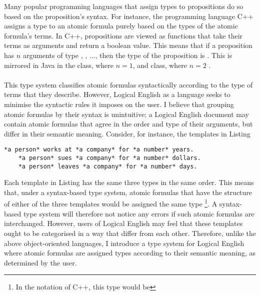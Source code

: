 \documentclass[../main.tex]{subfiles}
\begin{document}
Many popular programming languages that assign types to propositions do so based on the proposition's syntax. For instance, the programming language C++ assigns a type to an atomic formula purely based on the types of the atomic formula's terms. In C++, propositions are viewed as functions that take their terms as arguments and return a boolean value. This means that if a proposition has $n$ arguments of type , , $\dots$,  then the type of the proposition is  \cite{std_predicate}. This is mirrored in Java in the  class, where $n = 1$, and  class, where $n = 2$ \cite{java_util_function}. 
\\
\\
This type system classifies atomic formulas syntactically according to the type of terms that they describe. However, Logical English as a language seeks to minimise the syntactic rules it imposes on the user. I believe that grouping atomic formulas by their syntax is unintuitive; a Logical English document may contain atomic formulas that agree in the order and type of their arguments, but differ in their semantic meaning. Consider, for instance, the templates in Listing \cite{le:same-product-type}
\begin{lstlisting}[language=LE,caption={Logical English templates that have differing semantic meaning, but under a syntactic type system would be grouped under the same type.},label={le:same-product-type}]
    *a person* works at *a company* for *a number* years.
    *a person* sues *a company* for *a number* dollars.
    *a person* leaves *a company* for *a number* days.
\end{lstlisting}
Each template in Listing \cite{le:same-product-type} has the same three types in the same order. This means that, under a syntax-based type system, atomic formulas that have the structure of either of the three templates would be assigned the same type 
\footnote{In the notation of C++, this type would be }.
A syntax-based type system will therefore not notice any errors if such atomic formulas are interchanged. However, users of Logical English may feel that these templates ought to be categorised in a way that differ from each other. Therefore, unlike the above object-oriented languages, I introduce a type system for Logical English where atomic formulas are assigned types according to their semantic meaning, as determined by the user.
\end{document}
